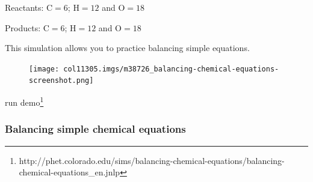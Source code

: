 {\begin{mdframed}[linewidth=4, leftmargin=40, rightmargin=40]
\begin{exercise}
\begin{enumerate}[noitemsep, label=\textbf{Step} \textbf{\arabic*}. ]
        \label{m38726*id65171}Reactants: \begin{math}\mathrm{C}=6\end{math}; \begin{math}\mathrm{H}=12\end{math} and \begin{math}\mathrm{O}=18\end{math}\par 
        \label{m38726*id65176}Products: \begin{math}\mathrm{C}=6\end{math}; \begin{math}\mathrm{H}=12\end{math} and \begin{math}\mathrm{O}=18\end{math}\par 
 \end{enumerate}
         

    \end{exercise}
    \end{mdframed}
    }
    \noindent
  
\label{m38726*eip-453}This simulation allows you to practice balancing simple equations.

    \setcounter{subfigure}{0}


	\begin{figure}[H] %
    \begin{center}
    \label{m38726*id63458!!!underscore!!!media}\label{m38726*id63458!!!underscore!!!printimage}\texttt{[image: col11305.imgs/m38726\_balancing-chemical-equations-screenshot.png]} %
        
      \vspace{2pt}
    \vspace{.1in}
    
    \end{center}

 \end{figure}   

    \addtocounter{footnote}{-0}
    

run demo\footnote{http://phet.colorado.edu/sims/balancing-chemical-equations/balancing-chemical-equations\_en.jnlp}
        \par \label{m38726*secfhsst!!!underscore!!!id763}
            \subsubsection{  Balancing simple chemical equations
        }
            \nopagebreak
            

